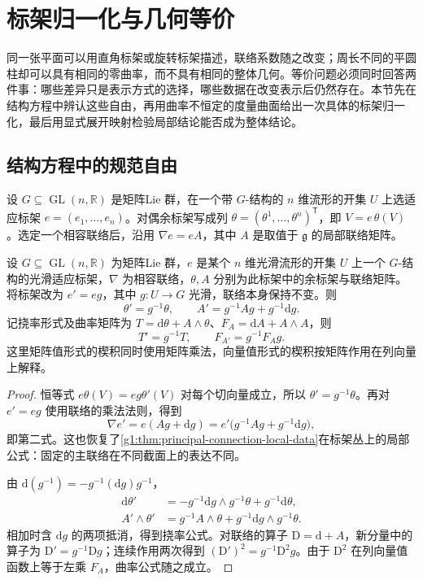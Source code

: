 \section{标架归一化与几何等价}
\label{g1:sec:D03}

同一张平面可以用直角标架或旋转标架描述，联络系数随之改变；周长不同的平圆柱却可以具有相同的零曲率，而不具有相同的整体几何。等价问题必须同时回答两件事：哪些差异只是表示方式的选择，哪些数据在改变表示后仍然存在。本节先在结构方程中辨认这些自由，再用曲率不恒定的度量曲面给出一次具体的标架归一化，最后用显式展开映射检验局部结论能否成为整体结论。

\subsection{结构方程中的规范自由}
\label{g1:subsec:D03:01}

设 \(G\subseteq\operatorname{GL}(n,\mathbb R)\) 是矩阵Lie 群，在一个带 \(G\)-结构的 \(n\) 维流形的开集 \(U\) 上选适应标架 \(e=(e_1,\ldots,e_n)\)。对偶余标架写成列 \(\theta=(\theta^1,\ldots,\theta^n)^{\mathsf T}\)，即 \(V=e\,\theta(V)\)。选定一个相容联络后，沿用 \(\nabla e=eA\)，其中 \(A\) 是取值于 \(\mathfrak g\) 的局部联络矩阵。

\begin{proposition}\label{g1:prop:equivalence-frame-change}
	设 \(G\subseteq\operatorname{GL}(n,\mathbb R)\) 为矩阵Lie 群，\(e\) 是某个 \(n\) 维光滑流形的开集 \(U\) 上一个 \(G\)-结构的光滑适应标架，\(\nabla\) 为相容联络，\(\theta,A\) 分别为此标架中的余标架与联络矩阵。将标架改为 \(e'=eg\)，其中 \(g:U\to G\) 光滑，联络本身保持不变。则
	\begin{equation}\label{g1:eq:equivalence-frame-change}
		\theta'=g^{-1}\theta,\qquad
		A'=g^{-1}Ag+g^{-1}\mathrm{d}g.
	\end{equation}
	记挠率形式及曲率矩阵为 \(T=\mathrm{d}\theta+A\wedge\theta\)、\(F_A=\mathrm{d}A+A\wedge A\)，则
	\[
		T'=g^{-1}T,\qquad F_{A'}=g^{-1}F_Ag.
	\]
	这里矩阵值形式的楔积同时使用矩阵乘法，向量值形式的楔积按矩阵作用在列向量上解释。
\end{proposition}
\begin{proof}
	恒等式 \(e\theta(V)=eg\theta'(V)\) 对每个切向量成立，所以 \(\theta'=g^{-1}\theta\)。再对 \(e'=eg\) 使用联络的乘法法则，得到
	\[
		\nabla e'=e(Ag+\mathrm{d}g)=e'\bigl(g^{-1}Ag+g^{-1}\mathrm{d}g\bigr),
	\]
	即第二式。这也恢复了\cref{g1:thm:principal-connection-local-data}在标架丛上的局部公式：固定的主联络在不同截面上的表达不同。

	由 \(\mathrm{d}(g^{-1})=-g^{-1}(\mathrm{d}g)g^{-1}\)，
	\[
		\begin{aligned}
			\mathrm{d}\theta'&=-g^{-1}\mathrm{d}g\wedge g^{-1}\theta+g^{-1}\mathrm{d}\theta,\\
			A'\wedge\theta'&=g^{-1}A\wedge\theta+g^{-1}\mathrm{d}g\wedge g^{-1}\theta.
		\end{aligned}
	\]
	相加时含 \(\mathrm{d}g\) 的两项抵消，得到挠率公式。对联络的算子 \(\mathrm{D}=\mathrm{d}+A\)，新分量中的算子为 \(\mathrm{D}'=g^{-1}\mathrm{D}g\)；连续作用两次得到 \((\mathrm{D}')^2=g^{-1}\mathrm{D}^2g\)。由于 \(\mathrm{D}^2\) 在列向量值函数上等于左乘 \(F_A\)，曲率公式随之成立。
\end{proof}

